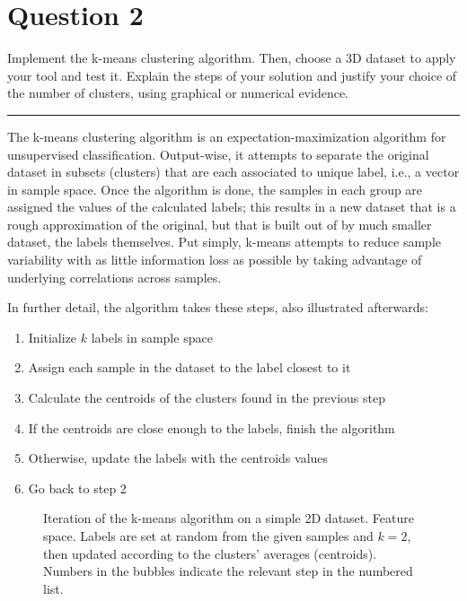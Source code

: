 \section{Question 2}
    Implement the k-means clustering algorithm. 
    Then, choose a 3D dataset to apply your tool and test it. 
    Explain the steps of your solution and justify your choice of the number of clusters, using graphical or numerical evidence.

\noindent\rule{\textwidth}{.5pt}

The k-means clustering algorithm is 
an expectation-maximization algorithm for unsupervised classification.
%
Output-wise, it attempts to separate the original dataset in subsets (clusters) 
that are each associated to unique label, i.e., a vector in sample space.
%
Once the algorithm is done, the samples in each group 
are assigned the values of the calculated labels;
this results in a new dataset that is a rough approximation of the original,
but that is built out of by much smaller dataset, the labels themselves.
%
Put simply, k-means attempts to reduce sample variability 
with as little information loss as possible by taking advantage of 
underlying correlations across samples. 

In further detail, the algorithm takes these steps, 
also illustrated afterwards:
%
\begin{enumerate}
    \item Initialize $k$ labels in sample space
    \item Assign each sample in the dataset to the label closest to it 
    \item Calculate the centroids of the clusters found in the previous step 
    \item If the centroids are close enough to the labels, finish the algorithm
    \item Otherwise, update the labels with the centroids values
    \item Go back to step 2
\end{enumerate}

\begin{figure}[htbp]
    \centering 
    \caption{
        Iteration of the k-means algorithm on a simple 2D dataset.
        Feature space.
        Labels are set at random from the given samples and $k=2$,
        then updated according to the clusters' averages (centroids).
        Numbers in the bubbles indicate the relevant step in the numbered list.
    }
    \label{fig:kmeans-illustration}
    
\end{figure}

